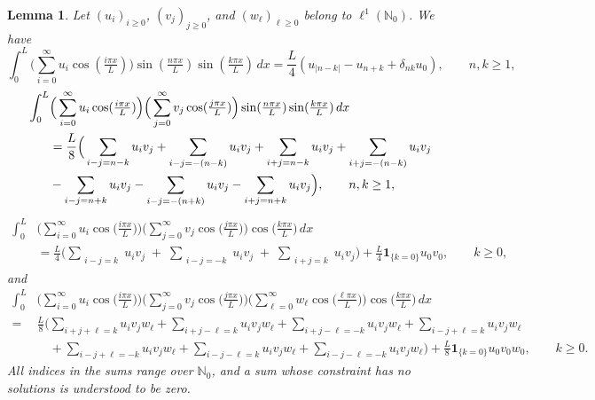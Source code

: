 \documentclass[11pt]{article} %
\newtheorem{lemma}{Lemma}[section]
\theoremstyle{remark}
\theoremstyle{remark}
\numberwithin{equation}{section}
\numberwithin{figure}{section}
\numberwithin{table}{section}
\begin{document}
\begin{lemma}\label{L:trig-integrals}
  Let $(u_i)_{i\ge 0}$, $(v_j)_{j\ge 0}$, and $(w_\ell)_{\ell\ge 0}$ belong to
  $\ell^1(\mathbb{N}_0)$. We have
  \begin{equation}\label{E:cosine-sine-sine}
    \int_0^L
    \Big(\sum_{i=0}^{\infty}u_i\cos(\tfrac{i\pi x}{L})\Big)\sin(\tfrac{n\pi
    x}{L})\sin(\tfrac{k\pi x}{L})\,dx
    =
    \frac{L}{4}
    \left(
    u_{|n-k|}-u_{n+k}
    +\delta_{nk}u_0
    \right),\qquad n,k\ge 1,
  \end{equation}
  \begin{align}\label{E:two-cosines-two-sines}
    \int_0^L
    &
    \Big(\sum_{i=0}^{\infty}u_i\cos(\tfrac{i\pi
    x}{L})\Big)
    \Big(\sum_{j=0}^{\infty}v_j\cos(\tfrac{j\pi
    x}{L})\Big)\sin(\tfrac{n\pi
    x}{L})\sin(\tfrac{k\pi
    x}{L})\,dx\nonumber \\
    & =\frac{L}{8}
    \Big(
    \sum_{\substack{ i-j =    n-k }} u_i v_j
    + \sum_{\substack{ i-j = -(n-k) }} u_i v_j
    + \sum_{\substack{ i+j =    n-k }} u_i v_j
    + \sum_{\substack{ i+j = -(n-k) }} u_i v_j \notag \\
    &
    - \sum_{\substack{ i-j =    n+k }} u_i v_j
    - \sum_{\substack{ i-j = -(n+k) }} u_i v_j
    - \sum_{\substack{ i+j =    n+k }} u_i v_j
    \Big), \qquad n,k\ge 1,
  \end{align}
  \begin{align}\label{E:cos-cos-cos}
    \int_0^L &
    \Big( \sum_{i=0}^{\infty} u_i \cos\Big(\tfrac{i\pi x}{L}\Big) \Big)
    \Big( \sum_{j=0}^{\infty} v_j \cos\Big(\tfrac{j\pi x}{L}\Big) \Big)
    \cos\Big(\tfrac{k\pi x}{L}\Big)\,dx\nonumber \\
    & =
    \frac{L}{4}\Big(
    \sum_{\substack{ i-j =  k }} u_i v_j
    \;+\;
    \sum_{\substack{ i-j = -k }} u_i v_j
    \;+\;
    \sum_{\substack{ i+j =  k }} u_i v_j
    \Big)
    +\frac{L}{4}\mathbf{1}_{\{k=0\}}u_0v_0, \qquad k\ge0,
  \end{align}
  and
  \begin{align}\label{E:cos-cos-cos-cos}
    \int_{0}^{L}
    & \Big( \sum_{i=0}^{\infty}
    u_i \cos\Big(\tfrac{i\pi
    x}{L}\Big) \Big)
    \Big( \sum_{j=0}^{\infty} v_j \cos\Big(\tfrac{j\pi x}{L}\Big) \Big)
    \Big( \sum_{\ell=0}^{\infty} w_\ell \cos\Big(\tfrac{\ell\pi x}{L}\Big) \Big)
    \cos\Big(\tfrac{k\pi x}{L}\Big)\,dx \\
    = & \frac{L}{8}\Big(
    \sum_{ i+j+\ell =  k } u_i v_j w_\ell
    + \sum_{ i+j-\ell =  k } u_i v_j w_\ell
    + \sum_{ i+j-\ell = -k } u_i v_j w_\ell
    + \sum_{ i-j+\ell =  k } u_i v_j w_\ell  \nonumber \\
    & \quad
    + \sum_{ i-j+\ell = -k } u_i v_j w_\ell
    + \sum_{ i-j-\ell =  k } u_i v_j w_\ell
    + \sum_{ i-j-\ell = -k } u_i v_j w_\ell
    \Big)
    +\frac{L}{8}\mathbf{1}_{\{k=0\}}u_0v_0w_0, \qquad k\ge0.
  \end{align}
  All indices in the sums range over $\mathbb{N}_0$, and a sum whose constraint
  has no solutions is understood to be zero.
\end{lemma}
\end{document}
